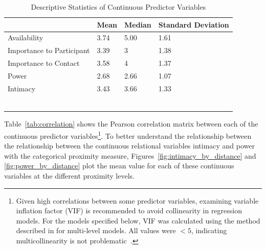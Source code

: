 \documentclass[12pt]{nuthesis}	%
\begin{document}
\begin{table}[ht]
\fontsize{9}{9.5}\selectfont \centering 
\begin{tabular}{llll}
\hline
                          & Mean & Median & Standard Deviation \\ \hline
Availability              & 3.74 & 5.00   & 1.61               \\
Importance to Participant & 3.39 & 3      & 1.38               \\
Importance to Contact     & 3.58 & 4      & 1.37               \\
Power                     & 2.68 & 2.66   & 1.07               \\
Intimacy                  & 3.43 & 3.66   & 1.33               \\ \hline
                          &      &        &                    \\
                          &      &        &                    \\
                          &      &        &                    \\
                          &      &        &                    \\
                          &      &        &                    \\
                          &      &        &                   
\end{tabular}
\caption{Descriptive Statistics of Continuous Predictor Variables}
\label{tab:descriptives}
\end{table}

Table~\ref{tab:correlation} shows the Pearson correlation matrix between each of the continuous predictor variables\footnote{Given high correlations between some predictor variables, examining variable inflation factor (VIF) is recommended to avoid collinearity in regression models. For the models specified below, VIF was calculated using the method described in \citet{zuur2009mixed} for multi-level models. All values were $< 5$, indicating multicollinearity is not problematic~\citep{sheather2009modern}.}. To better understand the relationship between the relationship between the continuous relational variables intimacy and power with the categorical proximity measure, Figures~\ref{fig:intimacy_by_distance} and \ref{fig:power_by_distance} plot the mean value for each of these continuous variables at the different proximity levels.
\end{document}
